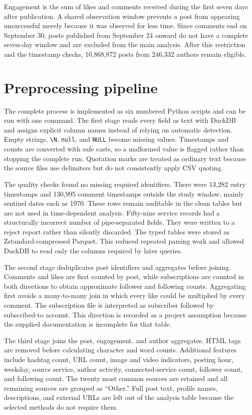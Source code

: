 \documentclass[10pt,a4paper]{article}
\begin{document}
Engagement is the sum of likes and comments received during the first seven days after publication. A shared observation window prevents a post from appearing unsuccessful merely because it was observed for less time. Since comments end on September 30, posts published from September 24 onward do not have a complete seven-day window and are excluded from the main analysis. After this restriction and the timestamp checks, 10,868,872 posts from 246,332 authors remain eligible.

\section{Preprocessing pipeline}

The complete process is implemented as six numbered Python scripts and can be run with one command. The first stage reads every field as text with DuckDB and assigns explicit column names instead of relying on automatic detection. Empty strings, \texttt{\textbackslash N}, \texttt{null}, and \texttt{NULL} become missing values. Timestamps and counts are converted with safe casts, so a malformed value is flagged rather than stopping the complete run. Quotation marks are treated as ordinary text because the source files use delimiters but do not consistently apply CSV quoting.

The quality checks found no missing required identifiers. There were 13,282 entry timestamps and 130,995 comment timestamps outside the study window, mainly sentinel dates such as 1970. These rows remain auditable in the clean tables but are not used in time-dependent analysis. Fifty-nine service records had a structurally incorrect number of pipe-separated fields. They were written to a reject report rather than silently discarded. The typed tables were stored as Zstandard-compressed Parquet. This reduced repeated parsing work and allowed DuckDB to read only the columns required by later queries.

The second stage deduplicates post identifiers and aggregates before joining. Comments and likes are first counted by post, while subscriptions are counted in both directions to obtain approximate follower and following counts. Aggregating first avoids a many-to-many join in which every like could be multiplied by every comment. The subscription file is interpreted as subscriber followed by subscribed-to account. This direction is recorded as a project assumption because the supplied documentation is incomplete for that table.

The third stage joins the post, engagement, and author aggregates. HTML tags are removed before calculating character and word counts. Additional features include hashtag count, URL count, image and video indicators, posting hour, weekday, source service, author activity, connected-service count, follower count, and following count. The twenty most common sources are retained and all remaining sources are grouped as ``Other.'' Full post text, profile names, descriptions, and external URLs are left out of the analysis table because the selected methods do not require them.
\end{document}
